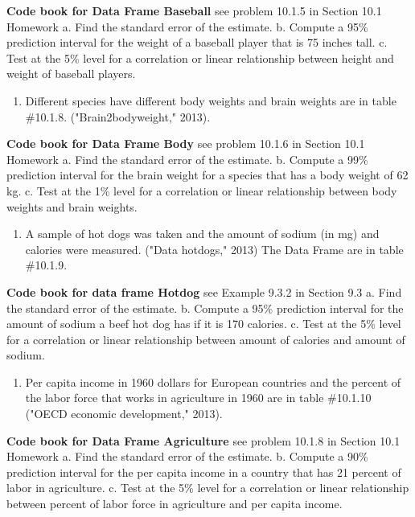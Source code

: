 \documentclass[]{book}
\providecommand{\tightlist}{%
  \setlength{\itemsep}{0pt}\setlength{\parskip}{0pt}}
\begin{document}
\textbf{Code book for Data Frame Baseball} see problem 10.1.5 in Section 10.1 Homework
a. Find the standard error of the estimate.
b. Compute a 95\% prediction interval for the weight of a baseball player that is 75 inches tall.
c. Test at the 5\% level for a correlation or linear relationship between height and weight of baseball players.

\begin{enumerate}
\def\labelenumi{\arabic{enumi}.}
\setcounter{enumi}{5}
\tightlist
\item
  Different species have different body weights and brain weights are in table \#10.1.8. ("Brain2bodyweight," 2013).
\end{enumerate}

\textbf{Code book for Data Frame Body} see problem 10.1.6 in Section 10.1 Homework
a. Find the standard error of the estimate.
b. Compute a 99\% prediction interval for the brain weight for a species that has a body weight of 62 kg.
c. Test at the 1\% level for a correlation or linear relationship between body weights and brain weights.

\begin{enumerate}
\def\labelenumi{\arabic{enumi}.}
\setcounter{enumi}{6}
\tightlist
\item
  A sample of hot dogs was taken and the amount of sodium (in mg) and calories were measured. ("Data hotdogs," 2013) The Data Frame are in table \#10.1.9.
\end{enumerate}

\textbf{Code book for data frame Hotdog} see Example 9.3.2 in Section 9.3
a. Find the standard error of the estimate.
b. Compute a 95\% prediction interval for the amount of sodium a beef hot dog has if it is 170 calories.
c. Test at the 5\% level for a correlation or linear relationship between amount of calories and amount of sodium.

\begin{enumerate}
\def\labelenumi{\arabic{enumi}.}
\setcounter{enumi}{7}
\tightlist
\item
  Per capita income in 1960 dollars for European countries and the percent of the labor force that works in agriculture in 1960 are in table \#10.1.10 ("OECD economic development," 2013).
\end{enumerate}

\textbf{Code book for Data Frame Agriculture} see problem 10.1.8 in Section 10.1 Homework
a. Find the standard error of the estimate.
b. Compute a 90\% prediction interval for the per capita income in a country that has 21 percent of labor in agriculture.
c. Test at the 5\% level for a correlation or linear relationship between percent of labor force in agriculture and per capita income.
\end{document}
